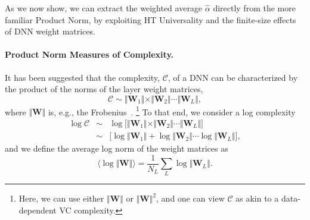 As we now show, we can extract the weighted average $\hat{\alpha}$ directly from the more familiar Product Norm, by exploiting HT Universality and the finite-size effects of DNN weight matrices.



\paragraph{Product Norm Measures of Complexity.} 

It has been suggested that the complexity, $\mathcal{C}$, of a DNN can be characterized by the product of the norms of the layer weight matrices,
$$
\mathcal{C}\sim\Vert\mathbf{W}_{1}\Vert\times\Vert\mathbf{W}_{2}\Vert\cdots\Vert\mathbf{W}_{L}\Vert ,
$$
where $\Vert\mathbf{W}\Vert$ is, e.g., the Frobenius~\cite{XXX-XXX,XXX-XXX,XXX-XXX}.%
\footnote{Here, we can use either $\Vert\mathbf{W}\Vert$ or $\Vert\mathbf{W}\Vert^{2}$,
and one can view $\mathcal{C}$ as akin to a data-dependent VC complexity.}
%
To that end, we consider a log complexity
\begin{eqnarray*}
\log\mathcal{C} &\sim& \log\bigg[\Vert\mathbf{W}_{1}\Vert\times\Vert\mathbf{W}_{2}\Vert\cdots\Vert\mathbf{W}_{L}\Vert\bigg]  \\
                &\sim& \bigg[\log\Vert\mathbf{W}_{1}\Vert+\log\Vert\mathbf{W}_{2}\Vert\cdots\log\Vert\mathbf{W}_{L}\Vert\bigg]  ,
\end{eqnarray*}
and we define the average log norm of the weight matrices as
\begin{equation}
\langle\log\Vert\mathbf{W}\Vert\rangle=\dfrac{1}{N_{L}}\sum_{L}\log\Vert\mathbf{W}_{L}\Vert  .
\label{eqn:av_log_norm}
\end{equation}


